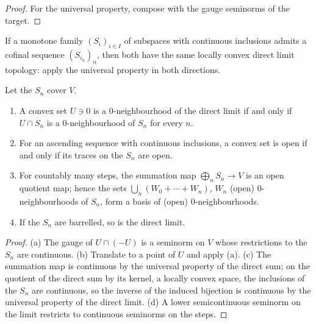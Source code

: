 \begin{proof}
  \leanok
  For the universal property, compose with the gauge seminorms of the target.
\end{proof}

\begin{remark}
  \label{rem:ds-cofinal}
  \leanok
  If a monotone family $(S_i)_{i \in I}$ of subspaces with continuous inclusions admits a cofinal
  sequence $(S_{i_n})_n$, then both have the same locally convex direct limit topology: apply the
  universal property in both directions.
\end{remark}

\begin{lemma}
  \label{lem:ds-convex-nhds}
  \leanok
  Let the $S_n$ cover $V$.
  \begin{enumerate}
    \item A convex set $U \ni 0$ is a $0$-neighbourhood of the direct limit if and only if
      $U \cap S_n$ is a $0$-neighbourhood of $S_n$ for every $n$.
    \item For an ascending sequence with continuous inclusions, a convex set is open if and only
      if its traces on the $S_n$ are open.
    \item For countably many steps, the summation map $\bigoplus_n S_n \to V$ is an open quotient
      map; hence the sets $\bigcup_n (W_0 + \cdots + W_n)$, $W_n$ (open) $0$-neighbourhoods of
      $S_n$, form a basis of (open) $0$-neighbourhoods.
    \item If the $S_n$ are barrelled, so is the direct limit.
  \end{enumerate}
\end{lemma}

\begin{proof}
  \leanok
  (a) The gauge of $U \cap (-U)$ is a seminorm on $V$ whose restrictions to the $S_n$ are
  continuous. (b) Translate to a point of $U$ and apply (a). (c) The summation map is continuous
  by the universal property of the direct sum; on the quotient of the direct sum by its kernel,
  a locally convex space, the inclusions of the $S_n$ are continuous, so the inverse of the
  induced bijection is continuous by the universal property of the direct limit. (d) A lower
  semicontinuous seminorm on the limit restricts to continuous seminorms on the steps.
\end{proof}

